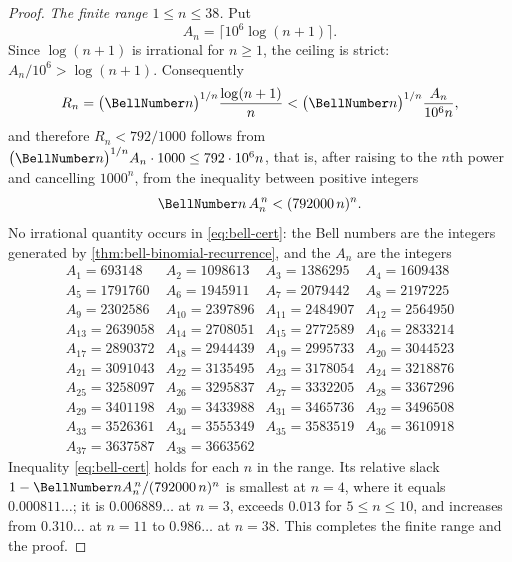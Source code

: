 \documentclass[11pt,a4paper,oneside,openany]{book}
\theoremstyle{definition}
\theoremstyle{remark}
\begin{document}
\begin{proof}
\emph{The finite range $1\le n\le38$.}  Put
\begin{equation}
 A_n=\bigl\lceil10^6\log(n+1)\bigr\rceil.                       \label{eq:bell-cert-An}
\end{equation}
Since $\log(n+1)$ is irrational for $n\ge1$, the ceiling is strict:
$A_n/10^6>\log(n+1)$.  Consequently
\[
 R_n=\bigl(\BellNumber n\bigr)^{1/n}\frac{\log(n+1)}{n}
 <\bigl(\BellNumber n\bigr)^{1/n}\frac{A_n}{10^6n},
\]
and therefore $R_n<792/1000$ follows from
$\bigl(\BellNumber n\bigr)^{1/n}A_n\cdot1000\le792\cdot10^6n$, that is, after
raising to the $n$th power and cancelling $1000^n$, from the inequality
between positive integers
\begin{equation}
 \BellNumber n\,A_n^{\,n}<(792000\,n)^n.                         \label{eq:bell-cert}
\end{equation}
No irrational quantity occurs in \eqref{eq:bell-cert}: the Bell numbers are the
integers generated by \cref{thm:bell-binomial-recurrence}, and the $A_n$ are
the integers
\[
 \begin{array}{llll}
  A_{1}=693148 & A_{2}=1098613 & A_{3}=1386295 & A_{4}=1609438\\
  A_{5}=1791760 & A_{6}=1945911 & A_{7}=2079442 & A_{8}=2197225\\
  A_{9}=2302586 & A_{10}=2397896 & A_{11}=2484907 & A_{12}=2564950\\
  A_{13}=2639058 & A_{14}=2708051 & A_{15}=2772589 & A_{16}=2833214\\
  A_{17}=2890372 & A_{18}=2944439 & A_{19}=2995733 & A_{20}=3044523\\
  A_{21}=3091043 & A_{22}=3135495 & A_{23}=3178054 & A_{24}=3218876\\
  A_{25}=3258097 & A_{26}=3295837 & A_{27}=3332205 & A_{28}=3367296\\
  A_{29}=3401198 & A_{30}=3433988 & A_{31}=3465736 & A_{32}=3496508\\
  A_{33}=3526361 & A_{34}=3555349 & A_{35}=3583519 & A_{36}=3610918\\
  A_{37}=3637587 & A_{38}=3663562 &&
 \end{array}
\]
Inequality \eqref{eq:bell-cert} holds for each $n$ in the range.  Its relative
slack $1-\BellNumber n A_n^{\,n}/(792000\,n)^n$ is smallest at $n=4$, where it
equals $0.000811\ldots$; it is $0.006889\ldots$ at $n=3$, exceeds $0.013$ for
$5\le n\le10$, and increases from $0.310\ldots$ at $n=11$ to $0.986\ldots$ at
$n=38$.  This completes the finite range and the proof.
\end{proof}
\end{document}
